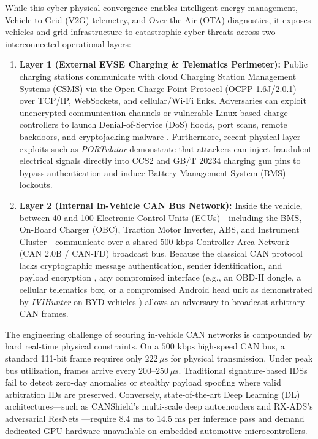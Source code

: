 \documentclass[conference]{IEEEtran}
\begin{document}
While this cyber-physical convergence enables intelligent energy management, Vehicle-to-Grid (V2G) telemetry, and Over-the-Air (OTA) diagnostics, it exposes vehicles and grid infrastructure to catastrophic cyber threats across two interconnected operational layers:
\begin{enumerate}
    \item \textbf{Layer 1 (External EVSE Charging \& Telematics Perimeter):} Public charging stations communicate with cloud Charging Station Management Systems (CSMS) via the Open Charge Point Protocol (OCPP 1.6J/2.0.1) over TCP/IP, WebSockets, and cellular/Wi-Fi links. Adversaries can exploit unencrypted communication channels or vulnerable Linux-based charge controllers to launch Denial-of-Service (DoS) floods, port scans, remote backdoors, and cryptojacking malware \cite{lashkari2024}. Furthermore, recent physical-layer exploits such as \textit{PORTulator} \cite{chen2025} demonstrate that attackers can inject fraudulent electrical signals directly into CCS2 and GB/T 20234 charging gun pins to bypass authentication and induce Battery Management System (BMS) lockouts.
    \item \textbf{Layer 2 (Internal In-Vehicle CAN Bus Network):} Inside the vehicle, between 40 and 100 Electronic Control Units (ECUs)---including the BMS, On-Board Charger (OBC), Traction Motor Inverter, ABS, and Instrument Cluster---communicate over a shared $500\text{ kbps}$ Controller Area Network (CAN 2.0B / CAN-FD) broadcast bus. Because the classical CAN protocol lacks cryptographic message authentication, sender identification, and payload encryption \cite{hoppe2008}, any compromised interface (e.g., an OBD-II dongle, a cellular telematics box, or a compromised Android head unit as demonstrated by \textit{IVIHunter} on BYD vehicles \cite{xu2026}) allows an adversary to broadcast arbitrary CAN frames.
\end{enumerate}

The engineering challenge of securing in-vehicle CAN networks is compounded by hard real-time physical constraints. On a $500\text{ kbps}$ high-speed CAN bus, a standard 111-bit frame requires only $222\,\mu\text{s}$ for physical transmission. Under peak bus utilization, frames arrive every $200\text{--}250\,\mu\text{s}$. Traditional signature-based IDSs fail to detect zero-day anomalies or stealthy payload spoofing where valid arbitration IDs are preserved. Conversely, state-of-the-art Deep Learning (DL) architectures---such as CANShield's multi-scale deep autoencoders \cite{zhang2022} and RX-ADS's adversarial ResNets \cite{tariq2022}---require $8.4\text{ ms}$ to $14.5\text{ ms}$ per inference pass and demand dedicated GPU hardware unavailable on embedded automotive microcontrollers.
\end{document}
